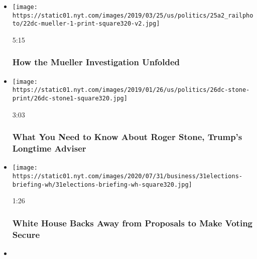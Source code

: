 \begin{itemize}
\item
  \href{https://www.nytimes.com/video/us/politics/100000006381390/robert-mueller-report-background.html?action=click\&module=video-series-bar\&region=header\&pgtype=Article\&playlistId=video/us-politics}{}

  \texttt{[image: https://static01.nyt.com/images/2019/03/25/us/politics/25a2\_railphoto/22dc-mueller-1-print-square320-v2.jpg]}

  5:15

  \hypertarget{how-the-mueller-investigation-unfolded}{%
  \subsubsection{How the Mueller Investigation
  Unfolded}\label{how-the-mueller-investigation-unfolded}}
\item
  \href{https://www.nytimes.com/video/us/politics/100000006236443/who-is-roger-stone.html?action=click\&module=video-series-bar\&region=header\&pgtype=Article\&playlistId=video/us-politics}{}

  \texttt{[image: https://static01.nyt.com/images/2019/01/26/us/politics/26dc-stone-print/26dc-stone1-square320.jpg]}

  3:03

  \hypertarget{what-you-need-to-know-about-roger-stone-trumps-longtime-adviser}{%
  \subsubsection{What You Need to Know About Roger Stone, Trump's
  Longtime
  Adviser}\label{what-you-need-to-know-about-roger-stone-trumps-longtime-adviser}}
\item
  \href{https://www.nytimes.com/video/us/100000007267362/white-house-mail-in-ballots-election.html?action=click\&module=video-series-bar\&region=header\&pgtype=Article\&playlistId=video/us-politics}{}

  \texttt{[image: https://static01.nyt.com/images/2020/07/31/business/31elections-briefing-wh/31elections-briefing-wh-square320.jpg]}

  1:26

  \hypertarget{white-house-backs-away-from-proposals-to-make-voting-secure}{%
  \subsubsection{White House Backs Away from Proposals to Make Voting
  Secure}\label{white-house-backs-away-from-proposals-to-make-voting-secure}}
\item
  \href{https://www.nytimes.com/video/us/politics/100000007265038/trump-inhofe-audio-call.html?action=click\&module=video-series-bar\&region=header\&pgtype=Article\&playlistId=video/us-politics}{}


\end{itemize}
